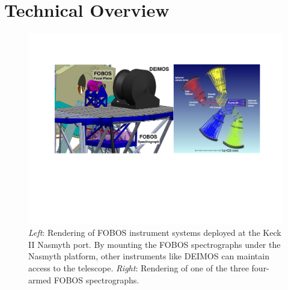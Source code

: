 \documentclass[oneside,11pt]{amsart}
\newcommand{\comment}[2][todo]{{\color{#1}[[{\bf #2}]]}}
\begin{document}
\section{Technical Overview}
\label{sec:project}



\begin{figure}[h!]
%
\vskip -0.1in
%
\includegraphics[width=\textwidth]{figs/FOBOS_inst.pdf}
%
\caption{\small {\it Left}: Rendering of FOBOS instrument systems
deployed at the Keck II Nasmyth port.  By mounting the FOBOS
spectrographs under the Nasmyth platform, other instruments like DEIMOS
can maintain access to the telescope. {\it Right}: Rendering of one of
the three four-armed FOBOS spectrographs.}
%
\label{fig:layout}
%
\end{figure}
\end{document}
